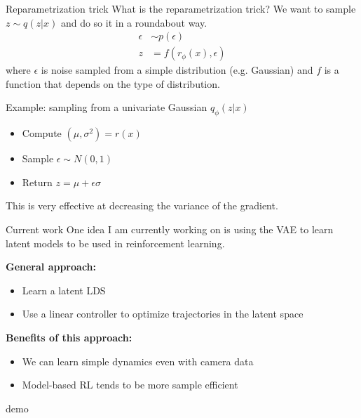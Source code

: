 \documentclass[10pt, compress]{beamer}
\begin{document}
\begin{frame}{Reparametrization trick}
  What is the reparametrization trick?
  \pause
  We want to sample $z \sim q(z | x)$ and do so
  it in a roundabout way.
  \begin{align*}
    \epsilon &\sim p(\epsilon) \\
    z &= f(r_\phi(x), \epsilon)
  \end{align*}
  where $\epsilon$ is noise sampled from a simple distribution (e.g. Gaussian)
  and $f$ is a function that depends on the type of distribution.
  \pause
  \begin{block}{Example: sampling from a univariate Gaussian $q_\phi(z | x)$}
    \begin{itemize}
  \pause
      \item Compute $(\mu, \sigma^2) = r(x)$
  \pause
      \item Sample $\epsilon \sim N(0, 1)$
  \pause
      \item Return $z = \mu + \epsilon\sigma$
    \end{itemize}
  \end{block}
  \pause
  This is very effective at decreasing the variance of the gradient.
\end{frame}
\begin{frame}{Current work}
  One idea I am currently working on is using the VAE to learn
  latent models to be used in reinforcement learning\footnotemark.

  \pause
  \textbf{General approach:}
  \begin{itemize}
    \item Learn a latent LDS
    \item Use a linear controller to optimize trajectories in the latent space
  \end{itemize}

  \pause
  \textbf{Benefits of this approach:}
  \begin{itemize}
      \pause
    \item We can learn simple dynamics even with camera data
      \pause
    \item Model-based RL tends to be more sample efficient
      \pause
  \end{itemize}
  \pause
  \alert{demo}
\end{frame}
\end{document}
